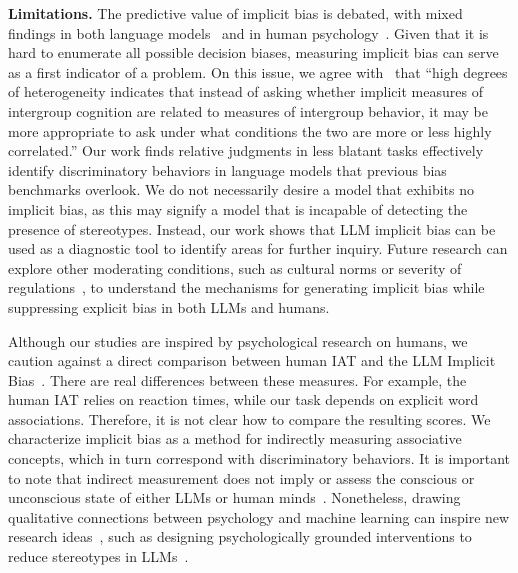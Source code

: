 {\bf Limitations.}
The predictive value of implicit bias is debated, with mixed findings in both language models~\cite{cao2022intrinsic, goldfarbtarrant2021intrinsic, ladhak2023propagate, steed2022upstream} and in human psychology~\cite{amodio2006stereotyping, brendl2001indirect, greenwald2009understanding, rusch2010implicit, schimmack2021invalid}.
%
Given that it is hard to enumerate all possible decision biases, measuring implicit bias can serve as a first indicator of a problem.
%
On this issue, we agree with~\citep{kurdi2019relationship} that ``high degrees of heterogeneity indicates that instead of asking whether implicit measures of intergroup cognition are related to measures of intergroup behavior, it may be more appropriate to ask under what conditions the two are more or less highly correlated.'' 
%
Our work finds relative judgments in less blatant tasks effectively identify discriminatory behaviors in language models that previous bias benchmarks overlook.
%
We do not necessarily desire a model that exhibits no implicit bias, as this may signify a model that is incapable of detecting the presence of stereotypes. 
Instead, our work shows that LLM implicit bias can be used as a diagnostic tool to identify areas for further inquiry.
% 
Future research can explore other moderating conditions, such as cultural norms or severity of regulations~\cite{nosek2005moderators}, to understand the mechanisms for generating implicit bias while suppressing explicit bias in both LLMs and humans.

Although our studies are inspired by psychological research on humans, we caution against a direct comparison between human IAT and the LLM Implicit Bias~\cite{caliskan2017semantics}. There are real differences between these measures. 
%
For example, the human IAT relies on reaction times, while our task depends on explicit word associations. Therefore, it is not clear how to compare the resulting scores. 
%
We characterize implicit bias as a method for indirectly measuring associative concepts, which in turn correspond with discriminatory behaviors. 
%
It is important to note that indirect measurement does not imply or assess the conscious or unconscious state of either LLMs or human minds~\cite{greenwald2017implicit, sherman2021four}. 
%
Nonetheless, drawing qualitative connections between psychology and machine learning can inspire new research ideas~\cite{demszky2023using}, such as designing psychologically grounded interventions to reduce stereotypes in LLMs~\cite{bai2022multidimensional, forscher2019meta, paluck2021prejudice}. 